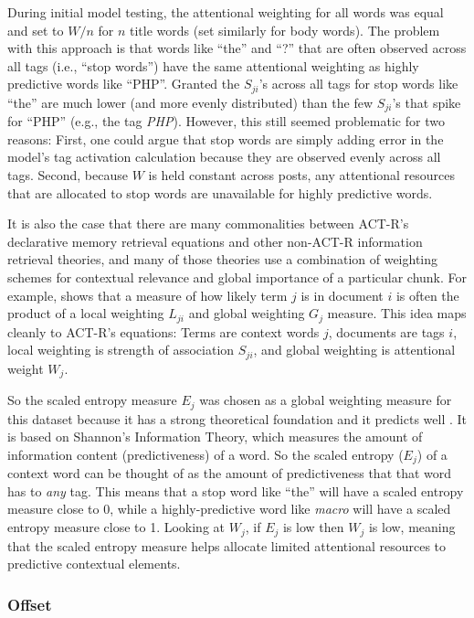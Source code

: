 \documentclass[10pt,letterpaper]{article}
\begin{document}
During initial model testing, the attentional weighting for all words was equal and set to $W/n$ for $n$ title words (set similarly for body words).
The problem with this approach is that words like ``the'' and ``?'' that are often observed across all tags (i.e., ``stop words'') have the same attentional weighting as highly predictive words like ``PHP''.
Granted the $S_{ji}$'s across all tags for stop words like ``the'' are much lower (and more evenly distributed) than the few $S_{ji}$'s that spike for ``PHP'' (e.g., the tag \emph{PHP}).
However, this still seemed problematic for two reasons:
First, one could argue that stop words are simply adding error in the model's tag activation calculation because they are observed evenly across all tags.
Second, because $W$ is held constant across posts, any attentional resources that are allocated to stop words are unavailable for highly predictive words.

It is also the case that there are many commonalities between ACT-R's declarative memory retrieval equations and other non-ACT-R information retrieval theories,
and many of those theories use a combination of weighting schemes for contextual relevance and global importance of a particular chunk.
For example,  shows that a measure of how likely term $j$ is in document $i$ is often the product of a local weighting $L_{ji}$ and global weighting $G_{j}$ measure.
This idea maps cleanly to ACT-R's equations: 
Terms are context words $j$, documents are tags $i$, local weighting is strength of association $S_{ji}$, and global weighting is attentional weight $W_{j}$.

So the scaled entropy measure $E_{j}$ was chosen as a global weighting measure for this dataset because it has a strong theoretical foundation and it predicts well \cite{Dumais1991}.
It is based on Shannon's Information Theory, which measures the amount of information content (predictiveness) of a word.
So the scaled entropy ($E_{j}$) of a context word can be thought of as the amount of predictiveness that that word has to \emph{any} tag.
This means that a stop word like ``the'' will have a scaled entropy measure close to 0, while a highly-predictive word like \emph{macro} will have a scaled entropy measure close to 1.
Looking at $W_{j}$, if $E_{j}$ is low then $W_{j}$ is low, meaning that the scaled entropy measure helps allocate limited attentional resources to predictive contextual elements.

\subsubsection{Offset}
\end{document}
